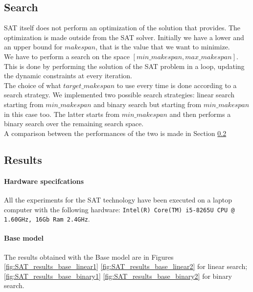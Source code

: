 
\subsection{Search}\label{subsec:SAT_search}
  SAT itself does not perform an optimization of the solution that provides.
  The optimization is made outside from the SAT solver. Initially we have a lower and an upper bound
  for \(makespan\), that is the value that we want to minimize.\\

  We have to perform a search on the space \([min\_makespan, max\_makespan]\). This is done by performing
  the solution of the SAT problem in a loop, updating the dynamic constraints at every iteration.\\

  The choice of what \(target\_makespan\) to use every time is done according to a search strategy.
  We implemented two possible search strategies: linear search starting from \(min\_makespan\) and
  binary search but starting from \(min\_makespan\) in this case too.
  The latter starts from \(min\_makespan\) and then performs a binary search over the remaining
  search space.\\

  A comparison between the performances of the two is made in Section \ref{subsec:SAT_results}


\subsection{Results}\label{subsec:SAT_results}

  \paragraph{Hardware specifcations}
    All the experiments for the SAT technology have been executed on a laptop computer with the following hardware:
    \texttt{Intel(R) Core(TM) i5-8265U CPU @ 1.60GHz, 16Gb Ram 2.4GHz}.\\

  \paragraph{Base model}
    The results obtained with the Base model are in Figures \ref{fig:SAT_results_base_linear1} \ref{fig:SAT_results_base_linear2}
    for linear search; \ref{fig:SAT_results_base_binary1} \ref{fig:SAT_results_base_binary2} for binary search.

